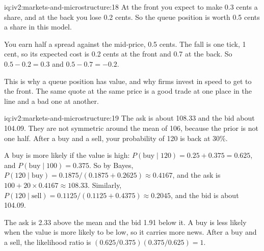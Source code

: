 \begin{solution}{iq:iv2:markets-and-microstructure:18}
At the front you expect to make 0.3 cents a share, and at the back you lose 0.2 cents. So the queue position is worth 0.5 cents a share in this model.

You earn half a spread against the mid-price, 0.5 cents. The fall is one tick, 1 cent, so its expected cost is 0.2 cents at the front and 0.7 at the back. So $0.5 - 0.2 = 0.3$ and $0.5 - 0.7 = -0.2$.

This is why a queue position has value, and why firms invest in speed to get to the front. The same quote at the same price is a good trade at one place in the line and a bad one at another.

\end{solution}

\begin{solution}{iq:iv2:markets-and-microstructure:19}
The ask is about 108.33 and the bid about 104.09. They are not symmetric around the mean of 106, because the prior is not one half. After a buy and a sell, your probability of 120 is back at 30\%.

A buy is more likely if the value is high: $P(\text{buy} \mid 120) = 0.25 + 0.375 = 0.625$, and $P(\text{buy} \mid 100) = 0.375$. So by Bayes, $P(120 \mid \text{buy}) = 0.1875/(0.1875 + 0.2625) \approx 0.4167$, and the ask is $100 + 20 \times 0.4167 \approx 108.33$. Similarly, $P(120 \mid \text{sell}) = 0.1125/(0.1125 + 0.4375) \approx 0.2045$, and the bid is about 104.09.

The ask is 2.33 above the mean and the bid 1.91 below it. A buy is less likely when the value is more likely to be low, so it carries more news. After a buy and a sell, the likelihood ratio is $(0.625/0.375)(0.375/0.625) = 1$.

\end{solution}

